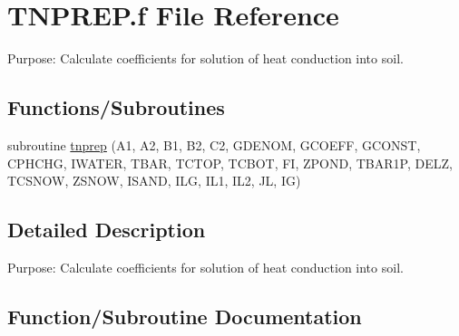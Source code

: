 \hypertarget{TNPREP_8f}{}\section{T\+N\+P\+R\+E\+P.\+f File Reference}
\label{TNPREP_8f}


Purpose\+: Calculate coefficients for solution of heat conduction into soil.  


\subsection*{Functions/\+Subroutines}
\begin{DoxyCompactItemize}
\item 
subroutine \hyperlink{TNPREP_8f_ab5cfd35272325655f17bcc52acb00535}{tnprep} (A1, A2, B1, B2, C2, G\+D\+E\+N\+O\+M, G\+C\+O\+E\+F\+F, G\+C\+O\+N\+S\+T, C\+P\+H\+C\+H\+G, I\+W\+A\+T\+E\+R, T\+B\+A\+R, T\+C\+T\+O\+P, T\+C\+B\+O\+T, F\+I, Z\+P\+O\+N\+D, T\+B\+A\+R1\+P, D\+E\+L\+Z, T\+C\+S\+N\+O\+W, Z\+S\+N\+O\+W, I\+S\+A\+N\+D, I\+L\+G, I\+L1, I\+L2, J\+L, I\+G)
\end{DoxyCompactItemize}


\subsection{Detailed Description}
Purpose\+: Calculate coefficients for solution of heat conduction into soil. 



\subsection{Function/\+Subroutine Documentation}
\hypertarget{TNPREP_8f_ab5cfd35272325655f17bcc52acb00535}{}
